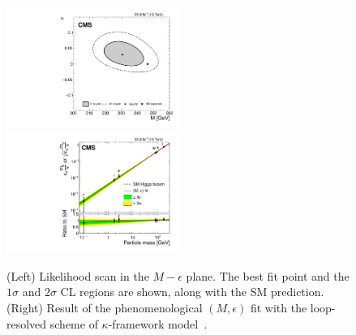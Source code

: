 \begin{figure}[!ht]
\begin{center}
\includegraphics[width=0.5\textwidth]{Fig/HIG17031/plot_Meps_2D}~
\includegraphics[width=0.5\textwidth]{Fig/HIG17031/plot_Meps_ratio}\\
\caption{(Left) Likelihood scan in the $M-\epsilon$ plane. The best fit point and the $1\sigma$ and $2\sigma$ CL regions are shown, along with the SM prediction. (Right) Result of the phenomenological $(M, \epsilon)$ fit with the loop-resolved scheme of $\kappa$-framework model~\cite{CMS-PAS-HIG-17-031}. \label{fig:kappaCMS2016_4}}
\end{center}
\end{figure}

